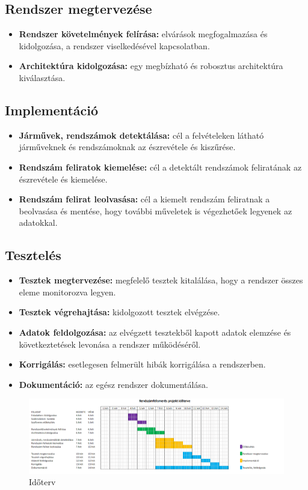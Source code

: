 \documentclass[12pt,a4paper]{article}
\begin{document}
    \subsection{Rendszer megtervezése}
    \begin{itemize}
        \item \textbf{Rendszer követelmények felírása:} elvárások megfogalmazása és kidolgozása, a rendszer viselkedésével kapcsolatban.
        \item \textbf{Architektúra kidolgozása:} egy megbízható és robosztus architektúra kiválasztása.
    \end{itemize}
    
    
    \subsection{Implementáció}
    \begin{itemize}
        \item \textbf{Járművek, rendszámok detektálása:} cél a felvételeken látható járműveknek és rendszámoknak az észrevétele és kiszűrése.
        \item \textbf{Rendszám feliratok kiemelése:} cél a detektált rendszámok feliratának az észrevétele és kiemelése.
        \item \textbf{Rendszám felirat leolvasása:} cél a kiemelt rendszám feliratnak a beolvasása és mentése, hogy további műveletek is végezhetőek legyenek az adatokkal.
    \end{itemize}
    
    \subsection{Tesztelés}
    \begin{itemize}
        \item \textbf{Tesztek megtervezése:} megfelelő tesztek kitalálása, hogy a rendszer összes eleme monitorozva legyen.
        \item \textbf{Tesztek végrehajtása:} kidolgozott tesztek elvégzése.
        \item \textbf{Adatok feldolgozása:} az elvégzett tesztekből kapott adatok elemzése és következtetések levonása a rendszer működéséről.
        \item \textbf{Korrigálás:} esetlegesen felmerült hibák korrigálása a rendszerben.
        \item \textbf{Dokumentáció:} az egész rendszer dokumentálása.
    \end{itemize}
    \begin{figure}[!htb]
        \center
        \includegraphics[width=1\columnwidth]{gannt.png}
        \caption{Időterv}
    \end{figure}
\end{document}
